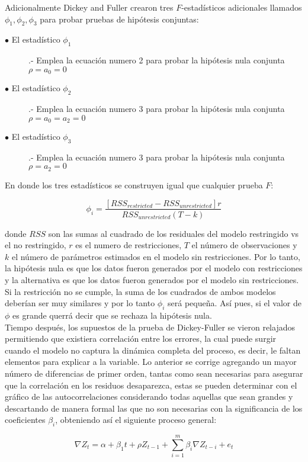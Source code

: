Adicionalmente Dickey and Fuller crearon tres $F$-estadísticos adicionales llamados $\phi_1,\phi_2,\phi_3$ para probar pruebas de hipótesis conjuntas:

\begin{description}
  \item [$\bullet$ El estadístico $\phi_1$] .- Emplea la ecuación numero 2 para probar la hipótesis nula conjunta $\rho=a_0=0$
  \item [$\bullet$ El estadístico $\phi_2$] .- Emplea la ecuación numero 3 para probar la hipótesis nula conjunta $\rho=a_0=a_2=0$
  \item [$\bullet$ El estadístico $\phi_3$] .- Emplea la ecuación numero 3 para probar la hipótesis nula conjunta $\rho=a_2=0$
\end{description}


En donde los tres estadísticos se construyen igual que cualquier prueba $F$:

$$ \phi_i = \frac{[RSS_{restricted}-RSS_{unrestricted}]r}{RSS_{unrestricted}(T-k)}$$

donde $RSS$ son las sumas al cuadrado de los residuales del modelo restringido vs el no restringido, $r$ es el numero de restricciones, $T$ el número de observaciones y $k$ el número de parámetros estimados en el modelo sin restricciones. Por lo tanto, la hipótesis nula es que los datos fueron generados por el modelo con restricciones y la alternativa es que los datos fueron generados por el modelo sin restricciones. Si la restricción no se cumple, la suma de los cuadrados de ambos modelos deberían ser muy similares y por lo tanto $\phi_i$ será pequeña. Así pues, si el valor de $\phi$ es grande querrá decir que se rechaza la hipótesis nula.\\


Tiempo después, los supuestos de la prueba de Dickey-Fuller se vieron relajados permitiendo que existiera correlación entre los errores, la cual puede surgir cuando el modelo no captura la dinámica completa del proceso, es decir, le faltan elementos para explicar a la variable. Lo anterior se corrige agregando un mayor número de diferencias de primer orden, tantas como sean necesarias para asegurar que la correlación en los residuos desaparezca, estas  se pueden determinar con el gráfico de las autocorrelaciones considerando todas aquellas que sean grandes y descartando de manera formal las que no son necesarias con la significancia de los coeficientes  $\beta_i$, obteniendo así el siguiente proceso general:

  \begin{equation}
 \nabla Z_t= \alpha + \beta_1 t + \rho Z_{t-1} + \sum_{i=1}^{m} \beta_i \nabla Z_{t-i} + e_t
 \end{equation}


